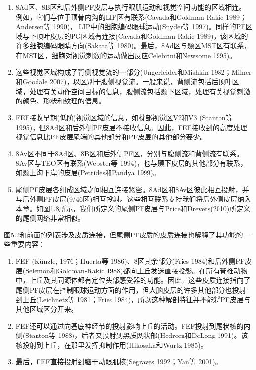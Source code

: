 \begin{enumerate}
	\item 8Ad区、8B区和后外侧PF皮层与执行眼肌运动和视觉空间功能的区域相连。例如，它们与位于顶骨内沟的LIP区有联系(Cavada和Goldman-Rakic 1989；Andersen等 1990)， LIP中的细胞编码眼球运动(Snyder等 1997)。同样的PF区域与下顶叶皮层的PG区域有连接(Cavada和Goldman-Rakic 1989)，该区域的许多细胞编码眼睛方向(Sakata等 1980)。最后，8Ad区与颞区MST区有联系，在MST区，细胞对视觉刺激的运动做出反应Celebrini和Newsome 1995)。
	\item 这些视觉区域构成了背侧视觉流的一部分(Ungerleider和Mishkin 1982；Milner和Goodale 2007)，以区别于腹侧视觉流。一般来说，背侧流包括后顶叶区域，处理有关动作空间目标的信息，腹侧流包括颞下区域，处理有关视觉刺激的颜色、形状和纹理的信息。
	\item FEF接收早期(低阶)视觉区域的信息，如枕部视觉区V2和V3 (Stanton等 1995)，但8Ad区和后外侧PF皮层不接收信息。因此，FEF接收到的高度处理视觉信息比PF皮层尾端的其他部分和PF皮层的其他部分要少。
	\item 8Av区不同于8Ad区、8B区和后外侧PF区，分别与腹侧流和背侧流有联系。8Av区与TEO区有联系(Webster等 1994)，也与颞下皮层的其他部分有联系，如颞上沟下岸的皮层(Petrides和Pandya 1999)。
	\item 尾侧PF皮层各组成区域之间相互连接紧密。8Ad区和8Av区彼此相互投射，并与后外侧PF皮层(9/46区)相互投射。这些相互联系支持我们将后外侧皮层纳入本章。如图1.8所示，我们所定义的尾侧PF皮层与Price和Drevets(2010)所定义的尾侧网络非常相似。
\end{enumerate}

图5.2和前面的列表涉及皮质连接，但尾侧PF皮质的皮质连接也解释了其功能的一些重要内容：

\begin{enumerate}
	\item FEF (Künzle, 1976；Huerta等 1986)、8区其余部分(Fries 1984)和后外侧PF皮层(Selemon和Goldman-Rakic 1988)都向上丘发送直接投影。在所有脊椎动物中，上丘及其同源体都有定位头部感受器的功能。因此，这些皮质连接指向了尾侧PF皮层在控制眼球运动方面的作用，但大脑皮层的许多其他部分也投射到上丘(Leichnetz等 1981；Fries 1984)，所以这种解剖特征并不能将PF皮层与其他区域区分开来。
	\item FEF还可以通过向基底神经节的投射影响上丘的活动。FEF投射到尾状核的内侧(Stanton等 1988)，后者又投射到黑质网状部(Hedreen和DeLong 1991)。该核投射到上丘，在那里发挥抑制作用(Hikosaka和Wurtz 1985)。
	\item 最后，FEF直接投射到脑干动眼肌核(Segraves 1992；Yan等 2001)。
\end{enumerate}


